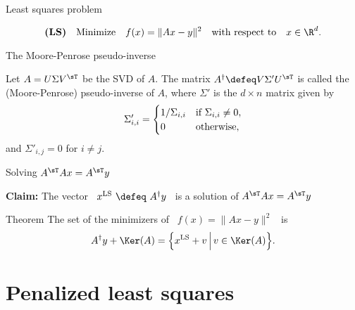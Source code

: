 \documentclass{beamer}
\begin{document}
\begin{frame}[t]{Least squares problem}
	\grid

	\vspace{-0.6cm}
	\begin{exampleblock}
		$$
		\textbf{(LS)} \quad \text{Minimize} \quad f(x) = \| Ax - y \|^2 \quad \text{with respect to} \quad x \in \R^d.
		$$
	\end{exampleblock}

\end{frame}
\begin{frame}[t]{The Moore-Penrose pseudo-inverse}
	\grid

	\vspace{-0.4cm}
	\begin{definition}
		Let $A = U \Sigma V^{\sT}$ be the SVD of $A$.
		The matrix $A^{\dagger} \defeq V \Sigma' U^{\sT}$ is called the (Moore-Penrose) pseudo-inverse of $A$, where $\Sigma'$ is the $d \times n$ matrix given by 
		\vspace{-0.4cm}
		$$
		\Sigma'_{i,i} =
		\begin{cases}
			1 / \Sigma_{i,i} & \text{if} \ \Sigma_{i,i} \neq 0, \\
			0 & \text{otherwise},
		\end{cases}
		\vspace{-0.2cm}
		$$
		and $\Sigma'_{i,j} = 0$ for $i \neq j$.
	\end{definition}

\end{frame}

\begin{frame}[t]{Solving $A^{\sT} A x = A^{\sT} y$}
	\grid

	\vspace{-0.1cm}
	\textbf{Claim:} The vector \ $x^{\rm LS} \ \defeq  \ A^{\dagger} y$ \ is a solution of $A^{\sT} A x = A^{\sT} y$

	\vspace{2cm}

	\begin{block}{Theorem}
		The set of the minimizers of \ $f(x) = \|Ax - y\|^2$ \ is
		$$
		A^{\dagger} y + \Ker(A) = \Big\{ x^{\rm LS} + v \, \Big| \, v \in \Ker(A) \Big\}.
		$$
	\end{block}
\end{frame}

\section{Penalized least squares}
\end{document}
